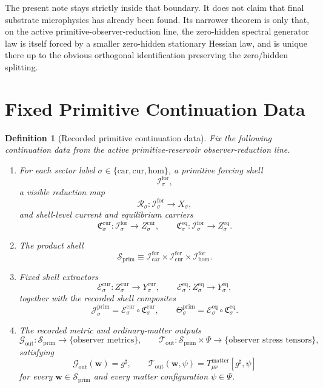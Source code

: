 \documentclass[11pt]{article}
\newcommand{\CompletedMetric}{g^{\sharp}}
\newcommand{\Car}{\mathrm{car}}
\newcommand{\Cur}{\mathrm{cur}}
\newcommand{\Hom}{\mathrm{hom}}
\newcommand{\ForSpace}[1]{\mathcal I_{#1}^{\mathrm{for}}}
\newcommand{\PrimShell}{\mathcal S_{\mathrm{prim}}}
\newcommand{\Reduction}[1]{\mathcal R_{#1}}
\newcommand{\CurrentCarrier}[1]{\mathfrak C_{#1}^{\mathrm{cur}}}
\newcommand{\EqCarrier}[1]{\mathfrak C_{#1}^{\mathrm{eq}}}
\newcommand{\CurrentExtract}[1]{\mathscr E_{#1}^{\mathrm{cur}}}
\newcommand{\EqExtract}[1]{\mathscr E_{#1}^{\mathrm{eq}}}
\newcommand{\PrimCurrent}[1]{\mathcal J_{#1}^{\mathrm{prim}}}
\newcommand{\PrimTheta}[1]{\Theta_{#1}^{\mathrm{prim}}}
\newcommand{\MetricOut}{\mathscr G_{\mathrm{out}}}
\newcommand{\MatterOut}{\mathscr T_{\mathrm{out}}}
\newtheorem{definition}{Definition}
\begin{document}
The present note stays strictly inside that boundary. It does not claim that final substrate microphysics has already been found. Its narrower theorem is only that, on the active primitive-observer-reduction line, the zero-hidden spectral generator law is itself forced by a smaller zero-hidden stationary Hessian law, and is unique there up to the obvious orthogonal identification preserving the zero/hidden splitting.

\section{Fixed Primitive Continuation Data}

\begin{definition}[Recorded primitive continuation data]
\label{def:fixed}
Fix the following continuation data from the active primitive-reservoir observer-reduction line.
\begin{enumerate}
    \item For each sector label \(\sigma\in\{\Car,\Cur,\Hom\}\), a primitive forcing shell
    \[
    \ForSpace{\sigma},
    \]
    a visible reduction map
    \[
    \Reduction{\sigma}:\ForSpace{\sigma}\to X_{\sigma},
    \]
    and shell-level current and equilibrium carriers
    \[
    \CurrentCarrier{\sigma}:\ForSpace{\sigma}\to Z_{\sigma}^{\mathrm{cur}},
    \qquad
    \EqCarrier{\sigma}:\ForSpace{\sigma}\to Z_{\sigma}^{\mathrm{eq}}.
    \]
    \item The product shell
    \[
    \PrimShell
    \equiv
    \ForSpace{\Car}\times \ForSpace{\Cur}\times \ForSpace{\Hom}.
    \]
    \item Fixed shell extractors
    \[
    \CurrentExtract{\sigma}:Z_{\sigma}^{\mathrm{cur}}\to Y_{\sigma}^{\mathrm{cur}},
    \qquad
    \EqExtract{\sigma}:Z_{\sigma}^{\mathrm{eq}}\to Y_{\sigma}^{\mathrm{eq}},
    \]
    together with the recorded shell composites
    \begin{equation}
    \PrimCurrent{\sigma}
    =
    \CurrentExtract{\sigma}\circ \CurrentCarrier{\sigma},
    \qquad
    \PrimTheta{\sigma}
    =
    \EqExtract{\sigma}\circ \EqCarrier{\sigma}.
    \label{eq:primcomposites}
    \end{equation}
    \item The recorded metric and ordinary-matter outputs
    \[
    \MetricOut:\PrimShell\to\{\text{observer metrics}\},
    \qquad
    \MatterOut:\PrimShell\times\Psi\to\{\text{observer stress tensors}\},
    \]
    satisfying
    \begin{equation}
    \MetricOut(\mathbf w)=\CompletedMetric,
    \qquad
    \MatterOut(\mathbf w,\psi)
    =
    T_{\mu\nu}^{\mathrm{matter}}[\CompletedMetric,\psi]
    \label{eq:fixedoutputs}
    \end{equation}
    for every \(\mathbf w\in\PrimShell\) and every matter configuration \(\psi\in\Psi\).
\end{enumerate}
\end{definition}
\end{document}
